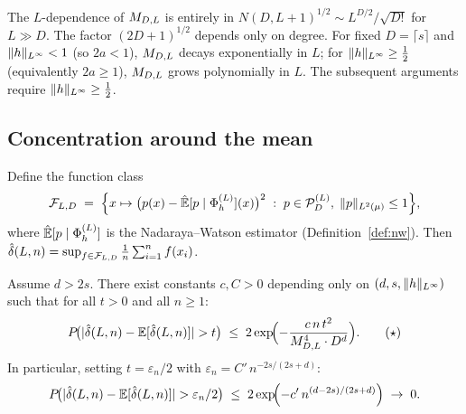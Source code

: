 \begin{remark}
The $L$-dependence of $M_{D,L}$ is entirely in $N(D,L+1)^{1/2} \sim L^{D/2}/\sqrt{D!}$
for $L \gg D$.
The factor $(2D+1)^{1/2}$ depends only on degree.
For fixed $D = \lceil s\rceil$ and $\|h\|_{L^{\infty}} < 1$ (so $2a < 1$),
$M_{D,L}$ decays exponentially in $L$; for $\|h\|_{L^{\infty}} \geq \frac{1}{2}$
(equivalently $2a \geq 1$), $M_{D,L}$ grows polynomially in $L$.
The subsequent arguments require $\|h\|_{L^{\infty}} \geq \frac{1}{2}$.
\end{remark}

\subsection{Concentration around the mean}
\label{subsec:mcdiarmiid}

Define the function class
\[
  \mathcal{F}_{L,D}
  \;=\;
  \Bigl\{x \mapsto \bigl(p(x) - \hat{\mathbb{E}}[p \mid \Phi_h^{(L)}](x)\bigr)^2
    \;:\; p \in \mathcal{P}_D^{(L)},\; \|p\|_{L^{2}(\mu)} \leq 1\Bigr\},
\]
where $\hat{\mathbb{E}}[p \mid \Phi_h^{(L)}]$ is the Nadaraya--Watson estimator
(Definition~\ref{def:nw}).
Then $\hat{\delta}(L,n) = \sup_{f \in \mathcal{F}_{L,D}} \frac{1}{n}\sum_{i=1}^n f(x_i)$.

\begin{proposition}
\label{prop:concentration}
Assume $d > 2s$.
There exist constants $c, C > 0$ depending only on $(d, s, \|h\|_{L^{\infty}})$
such that for all $t > 0$ and all $n \geq 1$:
\[
  P\!\bigl(|\hat{\delta}(L,n) - \mathbb{E}[\hat{\delta}(L,n)]| > t\bigr)
  \;\leq\;
  2\exp\!\Bigl(-\frac{c\,n\,t^2}{M_{D,L}^4 \cdot D^d}\Bigr).
  \tag{$\star$}
\]
In particular, setting $t = \varepsilon_n/2$ with
$\varepsilon_n = C'\,n^{-2s/(2s+d)}$:
\[
  P\!\bigl(|\hat{\delta}(L,n) - \mathbb{E}[\hat{\delta}(L,n)]| > \varepsilon_n/2\bigr)
  \;\leq\;
  2\exp\!\Bigl(-c'\,n^{(d-2s)/(2s+d)}\Bigr)
  \;\to\; 0.
\]
\end{proposition}

